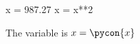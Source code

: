 \documentclass[12pt]{article}
\begin{document}
\begin{pyconsole}
x = 987.27 
x = x**2 
\end{pyconsole} 
The variable is $x=\pycon{x}$ 
\end{document}
